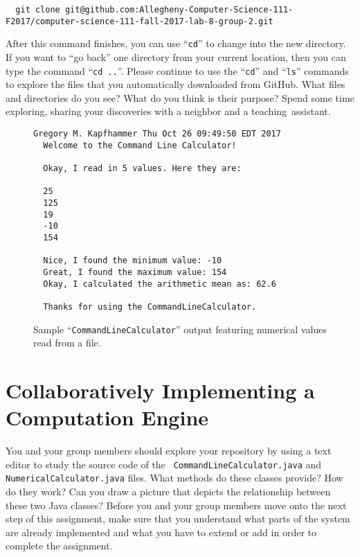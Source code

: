 \documentclass[11pt]{article}
\newcommand{\command}[1]{``\lstinline{#1}''}
\newcommand{\step}[1]{``{#1}''}
\begin{document}
\begin{lstlisting}
  git clone git@github.com:Allegheny-Computer-Science-111-F2017/computer-science-111-fall-2017-lab-8-group-2.git
\end{lstlisting}

After this command finishes, you can use \command{cd} to change into the new directory. If you want to \step{go back}
one directory from your current location, then you can type the command \command{cd ..}. Please continue to use the
\command{cd} and \command{ls} commands to explore the files that you automatically downloaded from GitHub. What files
and directories do you see? What do you think is their purpose? Spend some time exploring, sharing your discoveries with
a neighbor and a \mbox{teaching assistant}.

\begin{figure}[tb]
\begin{Verbatim}[commandchars=\\\{\}]
  Gregory M. Kapfhammer Thu Oct 26 09:49:50 EDT 2017
  Welcome to the Command Line Calculator!

  Okay, I read in 5 values. Here they are:

  25
  125
  19
  -10
  154

  Nice, I found the minimum value: -10
  Great, I found the maximum value: 154
  Okay, I calculated the arithmetic mean as: 62.6

  Thanks for using the CommandLineCalculator.
\end{Verbatim}
\vspace*{-.1in}
\caption{Sample ``{\tt CommandLineCalculator}'' output featuring numerical values read from a file.}
\label{fig:output}
\end{figure}

\section*{Collaboratively Implementing a Computation Engine}

You and your group members should explore your repository by using a text editor to study the source code of the {\tt
CommandLineCalculator.java} and {\tt NumericalCalculator.java} files. What methods do these classes provide? How do they
work? Can you draw a picture that depicts the relationship between these two Java classes? Before you and your group
members move onto the next step of this assignment, make sure that you understand what parts of the system are already
implemented and what you have to extend or add in order to complete the assignment.
\end{document}
